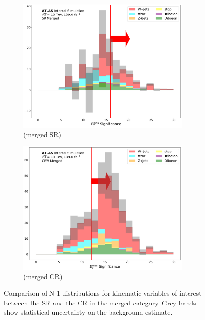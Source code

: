\begin{figure}[htbp]
 \begin{subfigure}{0.45\textwidth}
     \includegraphics[width = 0.95\textwidth]{Figures/App_SR_CR_distributions/SR1L_Merged/MetTST_Significance_N_1.pdf}
    \caption{\metsig (merged SR)}
     \end{subfigure}
    \begin{subfigure}{0.45\textwidth}
     \includegraphics[width = 0.95\textwidth]{Figures/App_SR_CR_distributions/CRW_Merged/MetTST_Significance_N_1.pdf}
     \caption{\metsig (merged \wjets CR)}
     \end{subfigure}
     
     \caption{Comparison of N-1 distributions for kinematic variables of interest between the SR and the \wjets CR in the merged category. Grey bands show statistical uncertainty on the background estimate.}
     \label{fig:N_1_CRW_merged}
  \end{figure}
